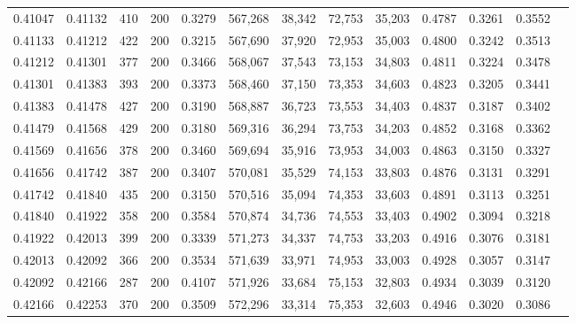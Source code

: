 \begin{tabular}{rrrrrrrrrrrrr}
0.41047 & 0.41132 &    410 & 200 &                                     0.3279 & 567,268 &  38,342 &  72,753 &  35,203 & 0.4787 & 0.3261 & 0.3552 \\
0.41133 & 0.41212 &    422 & 200 &                                     0.3215 & 567,690 &  37,920 &  72,953 &  35,003 & 0.4800 & 0.3242 & 0.3513 \\
0.41212 & 0.41301 &    377 & 200 &                                     0.3466 & 568,067 &  37,543 &  73,153 &  34,803 & 0.4811 & 0.3224 & 0.3478 \\
0.41301 & 0.41383 &    393 & 200 &                                     0.3373 & 568,460 &  37,150 &  73,353 &  34,603 & 0.4823 & 0.3205 & 0.3441 \\
0.41383 & 0.41478 &    427 & 200 &                                     0.3190 & 568,887 &  36,723 &  73,553 &  34,403 & 0.4837 & 0.3187 & 0.3402 \\
0.41479 & 0.41568 &    429 & 200 &                                     0.3180 & 569,316 &  36,294 &  73,753 &  34,203 & 0.4852 & 0.3168 & 0.3362 \\
0.41569 & 0.41656 &    378 & 200 &                                     0.3460 & 569,694 &  35,916 &  73,953 &  34,003 & 0.4863 & 0.3150 & 0.3327 \\
0.41656 & 0.41742 &    387 & 200 &                                     0.3407 & 570,081 &  35,529 &  74,153 &  33,803 & 0.4876 & 0.3131 & 0.3291 \\
0.41742 & 0.41840 &    435 & 200 &                                     0.3150 & 570,516 &  35,094 &  74,353 &  33,603 & 0.4891 & 0.3113 & 0.3251 \\
0.41840 & 0.41922 &    358 & 200 &                                     0.3584 & 570,874 &  34,736 &  74,553 &  33,403 & 0.4902 & 0.3094 & 0.3218 \\
0.41922 & 0.42013 &    399 & 200 &                                     0.3339 & 571,273 &  34,337 &  74,753 &  33,203 & 0.4916 & 0.3076 & 0.3181 \\
0.42013 & 0.42092 &    366 & 200 &                                     0.3534 & 571,639 &  33,971 &  74,953 &  33,003 & 0.4928 & 0.3057 & 0.3147 \\
0.42092 & 0.42166 &    287 & 200 &                                     0.4107 & 571,926 &  33,684 &  75,153 &  32,803 & 0.4934 & 0.3039 & 0.3120 \\
0.42166 & 0.42253 &    370 & 200 &                                     0.3509 & 572,296 &  33,314 &  75,353 &  32,603 & 0.4946 & 0.3020 & 0.3086 \\

\end{tabular}
